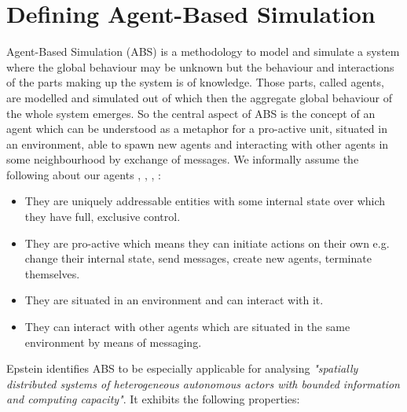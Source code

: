\section{Defining Agent-Based Simulation}
Agent-Based Simulation (ABS) is a methodology to model and simulate a system where the global behaviour may be unknown but the behaviour and interactions of the parts making up the system is of knowledge. Those parts, called agents, are modelled and simulated out of which then the aggregate global behaviour of the whole system emerges. So the central aspect of ABS is the concept of an agent which can be understood as a metaphor for a pro-active unit, situated in an environment, able to spawn new agents and interacting with other agents in some neighbourhood by exchange of messages. We informally assume the following about our agents \cite{siebers_introduction_2008}, \cite{wooldridge_introduction_2009}, \cite{siebers_discrete-event_2010}, \cite{dawson_opening_2014}:

\begin{itemize}
	\item They are uniquely addressable entities with some internal state over which they have full, exclusive control.
	\item They are pro-active which means they can initiate actions on their own e.g. change their internal state, send messages, create new agents, terminate themselves.
	\item They are situated in an environment and can interact with it.
	\item They can interact with other agents which are situated in the same environment by means of messaging.
\end{itemize} 

Epstein \cite{epstein_generative_2012} identifies ABS to be especially applicable for analysing \textit{"spatially distributed systems of heterogeneous autonomous actors with bounded information and computing capacity"}. %
It exhibits the following properties:

